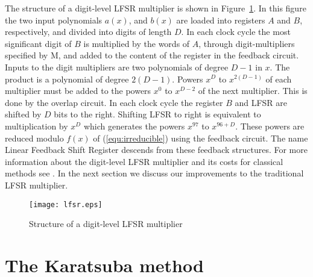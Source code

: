 \documentclass{article}
\begin{document}
The structure of a digit-level LFSR multiplier is shown in
Figure~\ref{fig:lfsr}. In this figure the two input polynomials
$a(x)$, and $b(x)$ are loaded into registers $A$ and $B$,
respectively, and divided into digits of length $D$. In each clock
cycle the most significant digit of $B$ is multiplied by the words of
$A$, through digit-multipliers specified by M, and added to the
content of the register in the feedback circuit.
Inputs to the digit multipliers are two polynomials of degree $D-1$ in $x$.
The product is a polynomial of degree $2(D-1)$. Powers $x^D$ to
$x^{2(D-1)}$ of each multiplier must be added to the powers $x^0$ to
$x^{D-2}$ of the next multiplier. This is done by the overlap circuit.
In each clock cycle the register $B$ and LFSR are shifted by $D$ bits to the right.
Shifting LFSR to right is equivalent to multiplication by $x^D$ which
generates the powers $x^{97}$ to $x^{96+D}$. These powers are reduced
modulo $f(x)$ of (\ref{equ:irreducible}) using the feedback circuit. 
The name Linear Feedback Shift Register descends from these feedback structures. 
 For more information about the digit-level LFSR multiplier and its
 costs for classical methods see \cite{sho06}. In the next section we
 discuss our improvements to the traditional LFSR multiplier.  

\begin{figure}
\texttt{[image: lfsr.eps]}
\caption{Structure of a digit-level LFSR multiplier}
\label{fig:lfsr}
\end{figure}


\section{The Karatsuba method}
\label{sec:circuit}
\end{document}
